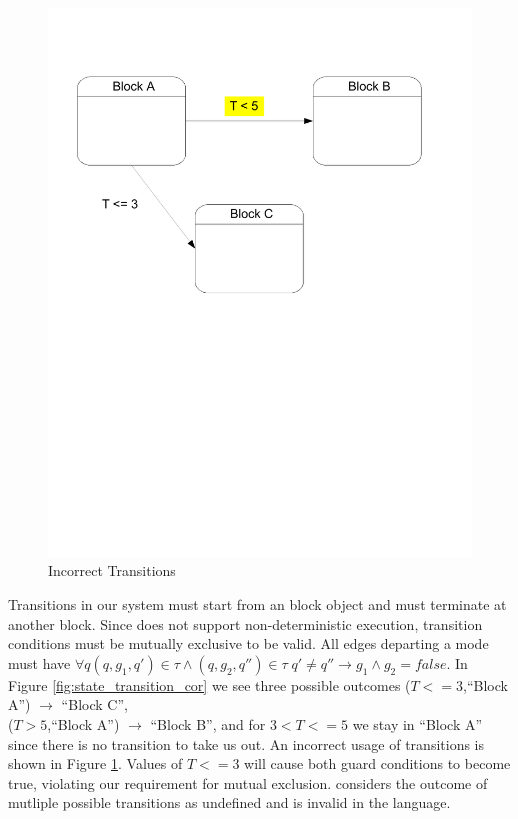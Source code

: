 \begin{figure}[htp]
    \centering
    \includegraphics[trim= 10mm 130mm 20mm 10mm, clip, width=\imgmedphoto]{./images/state_transition_bad.pdf}
    \caption{Incorrect Transitions}
    \label{fig:state_transition_bad}
\end{figure}

Transitions in our system must start from an block object and must terminate at another block. Since \emphasize{\plcchart} does not support non-deterministic execution, transition conditions must be mutually exclusive to be valid. All edges departing a mode must have ${\forall q} {(q,g_1,q') \in \tau} \wedge {(q,g_2,q'') \in \tau} \; {q' \neq q'' \rightarrow g_1 \wedge g_2 = false}$. In Figure \ref{fig:state_transition_cor} we see three possible outcomes ($T<=3$,``Block A'') $\rightarrow$ ``Block C'',  \\
($T>5$,``Block A'') $\rightarrow$ ``Block B'', and for $3 < T <= 5$ we stay in ``Block A'' since there is no transition to take us out. An incorrect usage of transitions is shown in Figure \ref{fig:state_transition_bad}. Values of $T <= 3$ will cause both guard conditions to become true, violating our requirement for mutual exclusion. \emphasize{\plcchart} considers the outcome of mutliple possible transitions as undefined and is invalid in the language.
